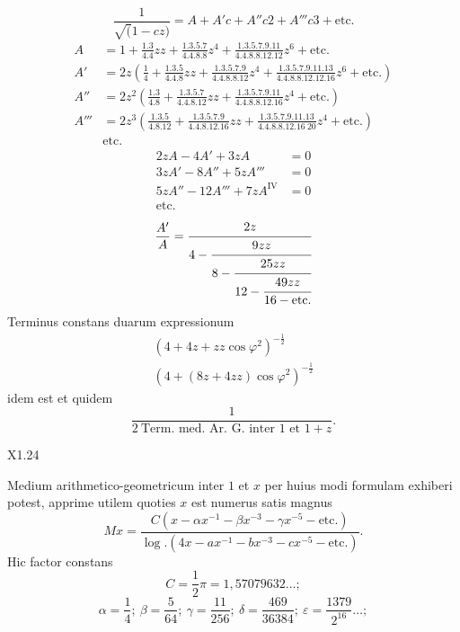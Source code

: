 \ClosingRule
\clearpage
{}
\noindent [S. 9]
\begin{equation}\tag*{[6]}\frac1{\surd(1-cz)}=A+A'c+A''c2+A'''c3+\text{etc.}\end{equation}
{\small
\[\begin{aligned}
A&=1+\frac{1.3}{4.4}zz+\frac{1.3.5.7}{4.4.8.8}z^4+\frac{1.3.5.7.9.11}{4.4.8.8.12.12}z^6+\text{etc.}\\
A'&=2z\left(\frac14+\frac{1.3.5}{4.4.8}zz+\frac{1.3.5.7.9}{4.4.8.8.12}z^4+\frac{1.3.5.7.9.11.13}{4.4.8.8.12.12.16}z^6+\text{etc.}\right)\\
A''&=2z^2\left(\frac{1.3}{4.8}+\frac{1.3.5.7}{4.4.8.12}zz+\frac{1.3.5.7.9.11}{4.4.8.8.12.16}z^4+\text{etc.}\right)\\
A'''&=2z^3\left(\frac{1.3.5}{4.8.12}+\frac{1.3.5.7.9}{4.4.8.12.16}zz+\frac{1.3.5.7.9.11.13}{4.4.8.8.12.16\ 20}z^4+\text{etc.}\right)\\
&\text{etc.}
\end{aligned}\]}
\[\begin{aligned}
2zA-4A'+3zA&=0\\
3zA'-8A''+5zA'''&=0\\
5zA''-12A'''+7zA^{\mathrm{IV}}&=0\\
\text{etc.}
\end{aligned}\]
\[\frac{A'}A=\cfrac{2z}{4-\cfrac{9zz}{8-\cfrac{25zz}{12-\cfrac{49zz}{16-\text{etc.}}}}}\]
\noindent Terminus constans duarum expressionum
\[\begin{gathered}
(4+4z+zz\cos\varphi^2)^{-\frac12}\\
(4+(8z+4zz)\cos\varphi^2)^{-\frac12}
\end{gathered}\]
\noindent idem est et quidem
\[\frac1{2\ \text{Term. med. Ar. G. inter 1 et }1+z}.\]
\par\vfill\noindent X1.\hfill24
\clearpage
{}
\noindent [S. 10]
\par\indent Medium arithmetico-geometricum inter \(1\) et \(x\) per huius modi formulam exhiberi potest, apprime utilem quoties \(x\) est numerus satis magnus
\begin{equation}\tag*{[7]}Mx=\frac{C(x-\alpha x^{-1}-\beta x^{-3}-\gamma x^{-5}-\text{etc.})}
{\log.(4x-ax^{-1}-bx^{-3}-cx^{-5}-\text{etc.})}.\end{equation}
\noindent Hic factor constans
\[C=\frac12\pi=1{,}57079632\ldots;\]
\[\alpha=\frac14;\ \beta=\frac5{64};\ \gamma=\frac{11}{256};\
\delta=\frac{469}{36384};\ \varepsilon=\frac{1379}{2^{16}}\ldots;\]

